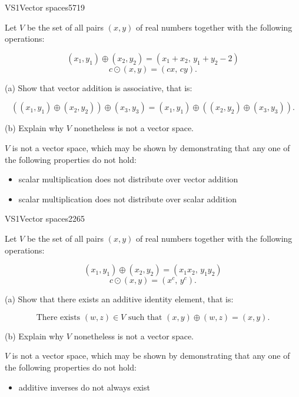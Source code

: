 \begin{exercise}{VS1}{Vector spaces}{5719} 
\begin{exerciseStatement} 

 Let \(V\) be the set of all pairs \((x,y)\) of real numbers together with the following operations: 

 \[(x_1,y_1)\oplus (x_2,y_2)=\left(x_{1} + x_{2},\,y_{1} + y_{2} - 2\right)\]\[c \odot (x,y) =\left(c x,\,c y\right).\] 

 (a) Show that vector addition is associative, that is: 

 \[
      \left((x_1,y_1)\oplus(x_2,y_2)\right)\oplus(x_3,y_3)=(x_1,y_1)\oplus\left((x_2,y_2)\oplus(x_3,y_3)\right).
    \] 

 (b) Explain why \(V\) nonetheless is not a vector space. 

 \end{exerciseStatement}
 \begin{exerciseAnswer} 

 \(V\) is not a vector space, which may be shown by demonstrating that any one of the following properties do not hold: 

 

\begin{itemize}
\item scalar multiplication does not distribute over vector addition
\item scalar multiplication does not distribute over scalar addition
\end{itemize}

     \end{exerciseAnswer}
 \end{exercise}


\begin{exercise}{VS1}{Vector spaces}{2265} 
\begin{exerciseStatement} 

 Let \(V\) be the set of all pairs \((x,y)\) of real numbers together with the following operations: 

 \[(x_1,y_1)\oplus (x_2,y_2)=\left(x_{1} x_{2},\,y_{1} y_{2}\right)\]\[c \odot (x,y) =\left(x^{c},\,y^{c}\right).\] 

 (a) Show that there exists an additive identity element, that is: 

 \[
      \text{There exists }(w,z)\in V\text{ such that }(x,y)\oplus(w,z)=(x,y).
    \] 

 (b) Explain why \(V\) nonetheless is not a vector space. 

 \end{exerciseStatement}
 \begin{exerciseAnswer} 

 \(V\) is not a vector space, which may be shown by demonstrating that any one of the following properties do not hold: 

 

\begin{itemize}
\item additive inverses do not always exist
\end{itemize}

     \end{exerciseAnswer}
 \end{exercise}


